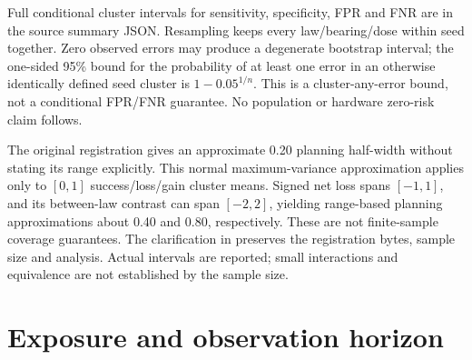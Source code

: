 \documentclass[10pt,letterpaper]{article}
\begin{document}
Full conditional cluster intervals for sensitivity, specificity, FPR and FNR are in the source summary JSON. Resampling keeps every law/bearing/dose within seed together. Zero observed errors may produce a degenerate bootstrap interval; the one-sided 95\% bound for the probability of at least one error in an otherwise identically defined seed cluster is $1-0.05^{1/n}$. This is a cluster-any-error bound, not a conditional FPR/FNR guarantee. No population or hardware zero-risk claim follows.

The original registration gives an approximate 0.20 planning half-width without stating its range explicitly. This normal maximum-variance approximation applies only to $[0,1]$ success/loss/gain cluster means. Signed net loss spans $[-1,1]$, and its between-law contrast can span $[-2,2]$, yielding range-based planning approximations about 0.40 and 0.80, respectively. These are not finite-sample coverage guarantees. The clarification in  preserves the registration bytes, sample size and analysis. Actual intervals are reported; small interactions and equivalence are not established by the sample size.

\section{Exposure and observation horizon}
\end{document}

